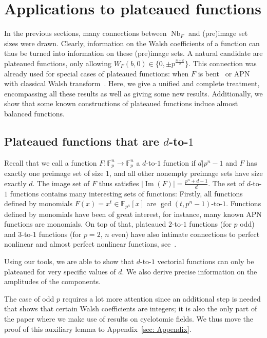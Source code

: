 \documentclass[11pt]{article}
\newcommand{\F}{\mathbb F}
\DeclareMathOperator{\Nb}{Nb}
\theoremstyle{plain}
\theoremstyle{definition}
\numberwithin{theorem}{section}
\numberwithin{equation}{section}
\numberwithin{table}{section}
\numberwithin{figure}{section}
\DeclareMathOperator{\image}{Im}
\begin{document}
{\section{Applications to plateaued functions} \label{sec:plateaeud}

In the previous sections, many connections between $\Nb_F$ and (pre)image set sizes were drawn. Clearly, information on the Walsh coefficients of a function can thus be turned into information on these (pre)image sets. A natural candidate are plateaued functions, only allowing $W_F(b,0)\in \{0,\pm p^{\frac{n+k}{2}}\}.$ This connection was already used for special cases of plateaued functions: when $F$ is bent~\cite{KoelschPolujan2024} or APN with classical Walsh transform~\cite{Koelsch2023}. Here, we give a unified and complete treatment, encompassing all these results as well as giving some new results. Additionally, we show that some known constructions of plateaued functions induce almost balanced functions.
\subsection{Plateaued functions that are $d$-to-$1$}\label{sec 4.1}
Recall that we call a function $F \colon \F_p^n \rightarrow \F_p^n$ a $d$-to-$1$ function if $d|p^n-1$ and $F$ has exactly one preimage set of size $1$, and all other nonempty preimage sets have size exactly $d$. The image set  of $F$ thus satisfies $|\image(F)|=\frac{p^n+d-1}{d}$. The set of $d$-to-$1$ functions contains many interesting sets of functions: Firstly, all functions defined by monomials $F(x)=x^t \in \F_{p^n}[x]$ are $\gcd(t,p^n-1)$-to-$1$. Functions defined by monomials have been of great interest, for instance, many known APN functions are monomials. On top of that, plateaued $2$-to-$1$ functions (for $p$ odd) and $3$-to-$1$ functions (for $p=2$, $n$ even) have also intimate connections to perfect nonlinear and almost perfect nonlinear functions, see~\cite{weng2012further,KoelschPolujan2024,Koelsch2023}.

Using our tools, we are able to show that $d$-to-$1$ vectorial functions can only be plateaued for very specific values of $d$. We also derive precise information on the amplitudes of the components. 

The case of odd $p$ requires a lot more attention since an additional step is needed that shows that certain Walsh coefficients are integers; it is also the only part of the paper where we make use of results on cyclotomic fields. We thus move the proof of this auxiliary lemma to Appendix~\ref{sec: Appendix}.

}
\end{document}
